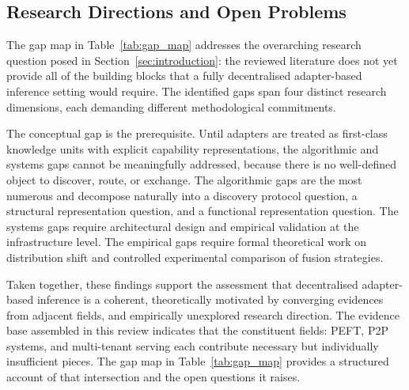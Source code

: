 \subsection{Research Directions and Open Problems}
\label{sec:synthesis_gap:directions}

The gap map in Table~\ref{tab:gap_map} addresses the overarching research question posed in Section~\ref{sec:introduction}: the reviewed literature does not yet provide all of the building blocks that a fully decentralised adapter-based inference setting would require. The identified gaps span four distinct research dimensions, each demanding different methodological commitments.

The conceptual gap is the prerequisite. Until adapters are treated as
first-class knowledge units with explicit capability representations, the
algorithmic and systems gaps cannot be meaningfully addressed, because there
is no well-defined object to discover, route, or exchange. The algorithmic
gaps are the most numerous and decompose naturally into a discovery protocol
question, a structural representation question, and a functional representation
question. The systems gaps require architectural design and empirical validation
at the infrastructure level. The empirical gaps require formal theoretical work
on distribution shift and controlled experimental comparison of fusion strategies.

Taken together, these findings support the assessment that decentralised adapter-based
inference is a coherent, theoretically motivated by converging evidences from adjacent fields, and empirically unexplored
research direction. The evidence base assembled in this review indicates that
the constituent fields: PEFT, P2P systems, and multi-tenant serving
each contribute necessary but individually insufficient pieces. The gap map in 
Table~\ref{tab:gap_map} provides a structured account of that intersection 
and the open questions it raises.